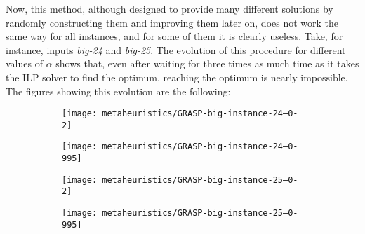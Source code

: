 \hfill

Now, this method, although designed to provide many different solutions by randomly
constructing them and improving them later on, does not work the same way for all instances,
and for some of them it is clearly useless. Take, for instance, inputs \textit{big-24} and
\textit{big-25}. The evolution of this procedure for different values of $\alpha$ shows that,
even after waiting for three times as much time as it takes the ILP solver to find the optimum,
reaching the optimum is nearly impossible. The figures showing this evolution are the
following:

\hfill

\begin{figure}[H]
    \centering
    \begin{subfigure}{0.45\textwidth}
        \centering
        \texttt{[image: metaheuristics/GRASP-big-instance-24--0-2]}
        \label{fig:trace:grasp:big-24:0.2}
    \end{subfigure}
    \begin{subfigure}{0.45\textwidth}
        \centering
        \texttt{[image: metaheuristics/GRASP-big-instance-24--0-995]}
        \label{fig:trace:grasp:big-24:0.995}
    \end{subfigure}
    \begin{subfigure}{0.45\textwidth}
        \centering
        \texttt{[image: metaheuristics/GRASP-big-instance-25--0-2]}
        \label{fig:trace:grasp:big-25:0.2}
    \end{subfigure}
    \begin{subfigure}{0.45\textwidth}
        \centering
        \texttt{[image: metaheuristics/GRASP-big-instance-25--0-995]}
        \label{fig:trace:grasp:big-25:0.995}
    \end{subfigure}
    \label{fig:trace:grasp:bigs}
\end{figure}

